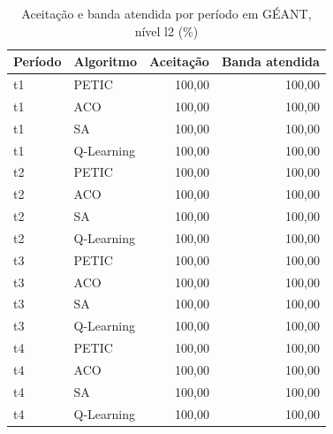 \begin{table}[htb]
    \centering
    \scriptsize
    \caption{Aceitação e banda atendida por período em GÉANT, nível l2 (\%)}
    \label{tab:periodos-geant-l2}
    \begin{tabular}{llrr}
        \hline
        Período & Algoritmo & Aceitação & Banda atendida \\
        \hline
        t1 & PETIC & 100,00 & 100,00 \\
        t1 & ACO & 100,00 & 100,00 \\
        t1 & SA & 100,00 & 100,00 \\
        t1 & Q-Learning & 100,00 & 100,00 \\
        t2 & PETIC & 100,00 & 100,00 \\
        t2 & ACO & 100,00 & 100,00 \\
        t2 & SA & 100,00 & 100,00 \\
        t2 & Q-Learning & 100,00 & 100,00 \\
        t3 & PETIC & 100,00 & 100,00 \\
        t3 & ACO & 100,00 & 100,00 \\
        t3 & SA & 100,00 & 100,00 \\
        t3 & Q-Learning & 100,00 & 100,00 \\
        t4 & PETIC & 100,00 & 100,00 \\
        t4 & ACO & 100,00 & 100,00 \\
        t4 & SA & 100,00 & 100,00 \\
        t4 & Q-Learning & 100,00 & 100,00 \\
        \hline
    \end{tabular}
\end{table}

